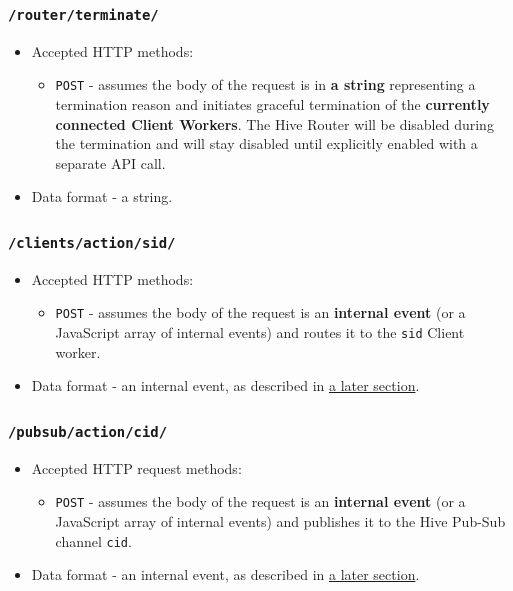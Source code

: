 \documentclass[a4paper]{article}
\begin{document}
\subsubsection{\texttt{/router/terminate/}}
\label{sec-6-1-5}


\begin{itemize}
\item Accepted HTTP methods:
\begin{itemize}
\item \texttt{POST} - assumes the body of the request is in \textbf{a string} representing a termination reason and initiates graceful termination of the \textbf{currently connected Client Workers}. The Hive Router will be disabled during the termination and will stay disabled until explicitly enabled with a separate API call.
\end{itemize}
\item Data format - a string.
\end{itemize}
\subsubsection{\texttt{/clients/action/sid/}}
\label{sec-6-1-6}



\begin{itemize}
\item Accepted HTTP methods:
\begin{itemize}
\item \texttt{POST} - assumes the body of the request is an \textbf{internal event} (or a JavaScript array of internal events) and routes it to the \texttt{sid} Client worker.
\end{itemize}
\item Data format - an internal event, as described in \hyperref[sec-9-3]{a later section}.
\end{itemize}
\subsubsection{\texttt{/pubsub/action/cid/}}
\label{sec-6-1-7}
\label{ref-api_pubsub}



\begin{itemize}
\item Accepted HTTP request methods:
\begin{itemize}
\item \texttt{POST} - assumes the body of the request is an \textbf{internal event} (or a JavaScript array of internal events) and publishes it to the Hive Pub-Sub channel \texttt{cid}.
\end{itemize}
\item Data format - an internal event, as described in \hyperref[sec-9-3]{a later section}.
\end{itemize}
\end{document}
